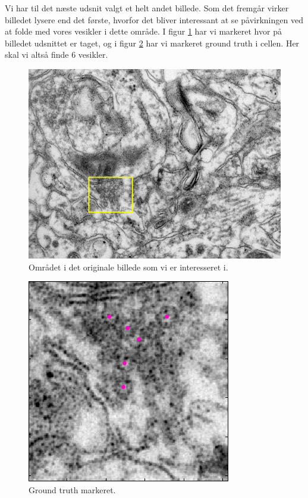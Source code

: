 Vi har til det næste udsnit valgt et helt andet billede. Som det fremgår virker billedet lysere end det første, hvorfor det bliver interessant at se påvirkningen ved at folde med vores vesikler i dette område. I figur \ref{fig:postmethod_conv_area2} har vi markeret hvor på billedet udsnittet er taget, og i figur \ref{fig:postmethod_conv_gt2} har vi markeret ground truth i cellen. Her skal vi altså finde 6 vesikler.

\begin{figure}[H]
		\centering
		\includegraphics[scale=0.5]{files/postmethod/img/area_2.png}
	\caption{Området i det originale billede som vi er interesseret i.\label{fig:postmethod_conv_area2}}
\end{figure}

\begin{figure}[H]
		\centering
		\includegraphics[scale=0.65]{files/postmethod/img/ground_truth2.png}
	\caption{Ground truth markeret.\label{fig:postmethod_conv_gt2}}
\end{figure}

